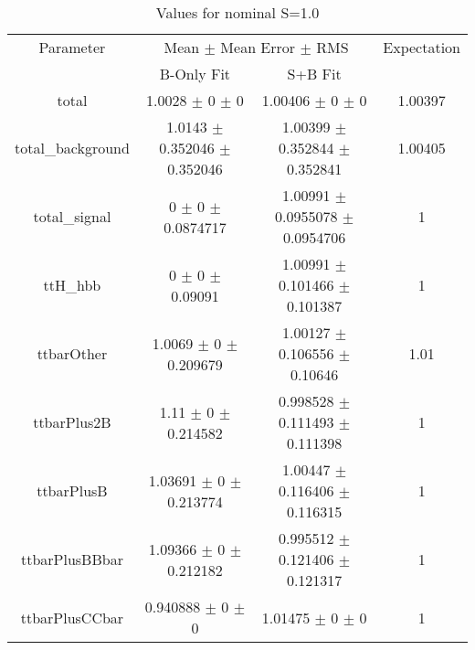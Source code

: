 \begin{table}
\centering
\caption{Values for nominal S=1.0}
\begin{tabular}{cccc}
\toprule
Parameter & \multicolumn{2}{c}{Mean $\pm$ Mean Error $\pm$ RMS} & Expectation\\
 & B-Only Fit & S+B Fit & \\
\midrule
total & \num{1.0028} $\pm$ \num{0} $\pm$ \num{0} & \num{1.00406} $\pm$ \num{0} $\pm$ \num{0} & \num{1.00397}\\
total\_background & \num{1.0143} $\pm$ \num{0.352046} $\pm$ \num{0.352046} & \num{1.00399} $\pm$ \num{0.352844} $\pm$ \num{0.352841} & \num{1.00405}\\
total\_signal & \num{0} $\pm$ \num{0} $\pm$ \num{0.0874717} & \num{1.00991} $\pm$ \num{0.0955078} $\pm$ \num{0.0954706} & \num{1}\\
ttH\_hbb & \num{0} $\pm$ \num{0} $\pm$ \num{0.09091} & \num{1.00991} $\pm$ \num{0.101466} $\pm$ \num{0.101387} & \num{1}\\
ttbarOther & \num{1.0069} $\pm$ \num{0} $\pm$ \num{0.209679} & \num{1.00127} $\pm$ \num{0.106556} $\pm$ \num{0.10646} & \num{1.01}\\
ttbarPlus2B & \num{1.11} $\pm$ \num{0} $\pm$ \num{0.214582} & \num{0.998528} $\pm$ \num{0.111493} $\pm$ \num{0.111398} & \num{1}\\
ttbarPlusB & \num{1.03691} $\pm$ \num{0} $\pm$ \num{0.213774} & \num{1.00447} $\pm$ \num{0.116406} $\pm$ \num{0.116315} & \num{1}\\
ttbarPlusBBbar & \num{1.09366} $\pm$ \num{0} $\pm$ \num{0.212182} & \num{0.995512} $\pm$ \num{0.121406} $\pm$ \num{0.121317} & \num{1}\\
ttbarPlusCCbar & \num{0.940888} $\pm$ \num{0} $\pm$ \num{0} & \num{1.01475} $\pm$ \num{0} $\pm$ \num{0} & \num{1}\\
\bottomrule
\end{tabular}
\end{table}